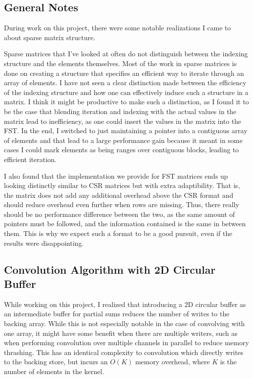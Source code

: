 \documentclass[12pt]{article}
\begin{document}
\subsection{General Notes}
During work on this project, there were some notable realizations I came to about sparse matrix
structure.

Sparse matrices that I've looked at often do not distinguish between the indexing structure and
the elements themselves. Most of the work in sparse matrices is done on creating a structure
that specifies an efficient way to iterate through an array of elements. I have not seen a clear
distinction made between the efficiency of the indexing structure and how one can effectively
induce such a structure in a matrix. I think it might be productive to make such a distinction,
as I found it to be the case that blending iteration and indexing with the actual values in the
matrix lead to inefficiency, as one could insert the values in the matrix into the FST. In the
end, I switched to just maintaining a pointer into a contiguous array of elements and that lead
to a large performance gain because it meant in some cases I could mark elements as being ranges
over contiguous blocks, leading to efficient iteration.

I also found that the implementation we provide for FST matrices ends up looking distinctly
similar to CSR matrices but with extra adaptibility. That is, the matrix does not add any
additional overhead above the CSR format and should reduce overhead even further when rows are
missing. Thus, there really should be no performance difference between the two, as the same
amount of pointers must be followed, and the information contained is the same in between them.
This is why we expect such a format to be a good pursuit, even if the results were
disappointing.

\subsection{Convolution Algorithm with 2D Circular Buffer}
While working on this project, I realized that introducing a 2D circular buffer as an
intermediate buffer for partial sums reduces the
number of writes to the backing array. While this is not especially notable in the case of
convolving with one array, it might have some benefit when there are multiple writers, such as
when performing convolution over multiple channels in parallel to reduce memory thrashing.
This has an identical complexity to convolution which directly writes to the backing store, but
incurs an $O(K)$ memory overhead, where $K$ is the number of elements in the kernel.
\end{document}
